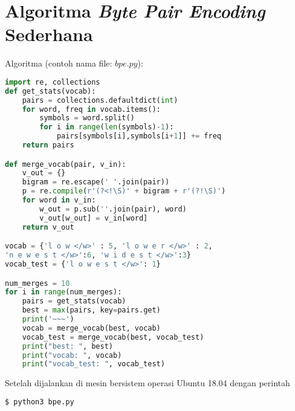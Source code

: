 \chapter{Algoritma \textit{Byte Pair Encoding} Sederhana}
\label{appendix:simple_bpe_algorithm}

Algoritma (contoh nama file: \(bpe.py\)):
\begin{lstlisting}[language=Python]
import re, collections
def get_stats(vocab):
    pairs = collections.defaultdict(int)
    for word, freq in vocab.items():
        symbols = word.split()
        for i in range(len(symbols)-1):
            pairs[symbols[i],symbols[i+1]] += freq
    return pairs

def merge_vocab(pair, v_in):
    v_out = {}
    bigram = re.escape(' '.join(pair))
    p = re.compile(r'(?<!\S)' + bigram + r'(?!\S)')
    for word in v_in:
        w_out = p.sub(''.join(pair), word)
        v_out[w_out] = v_in[word]
    return v_out

vocab = {'l o w </w>' : 5, 'l o w e r </w>' : 2,
'n e w e s t </w>':6, 'w i d e s t </w>':3}
vocab_test = {'l o w e s t </w>': 1}

num_merges = 10
for i in range(num_merges):
    pairs = get_stats(vocab)
    best = max(pairs, key=pairs.get)
    print('~~~')
    vocab = merge_vocab(best, vocab)
    vocab_test = merge_vocab(best, vocab_test)
    print("best: ", best)
    print("vocab: ", vocab)
    print("vocab_test: ", vocab_test)
\end{lstlisting}

Setelah dijalankan di mesin bersistem operasi Ubuntu 18.04 dengan perintah
\begin{lstlisting}[language=bash]
    $ python3 bpe.py
\end{lstlisting}

